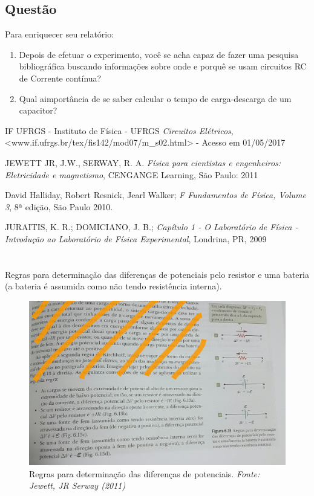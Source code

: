 \documentclass[a4paper,12pt]{article}
\begin{document}
\subsection{Questão}
\vspace{2.0ex}
Para enriquecer seu relatório:
\begin{enumerate} 
\item Depois de efetuar o experimento, você se acha capaz de fazer uma pesquisa bibliográfica buscando informações sobre onde e porquê se usam circuitos RC de Corrente contínua? 
\item Qual aimportância de se saber calcular o tempo de carga-descarga de um capacitor?
\end{enumerate}  
 
\begin{thebibliography}{9}

IF UFRGS - Instituto de Física - UFRGS
\emph{Circuitos Elétricos}, \\ <www.if.ufrgs.br/tex/fis142/mod07/m\_s02.html> - Acesso em 01/05/2017
 
  JEWETT JR, J.W., SERWAY, R. A. 
  \emph{Física para cientistas e engenheiros: Eletricidade e magnetismo},
  CENGANGE Learning,
  São Paulo:
  2011

David Halliday, Robert Resnick, Jearl Walker; \emph{F Fundamentos de Física, Volume 3}, 8ª edição, São Paulo 2010. 
 
JURAITIS, K. R.; DOMICIANO, J. B.; \emph{Capítulo 1 - O Laboratório de Física - Introdução ao Laboratório de Física Experimental}, Londrina, PR, 2009
  
  
\end{thebibliography}

\newpage
\appendix

\section{\appendixname} \label{anx:a}
Regras para determinação das diferenças de potenciais pelo resistor e uma bateria (a bateria é assumida como não tendo resistência interna).

\begin{figure}[htp]
\centering
\includegraphics[width=16cm]{fig_ap}
\caption{Regras para determinação das diferenças de potenciais. \textit{Fonte: Jewett, JR Serway (2011)\cite{jeewett11}}}
\label{fig:lion}
\end{figure}
\end{document}
